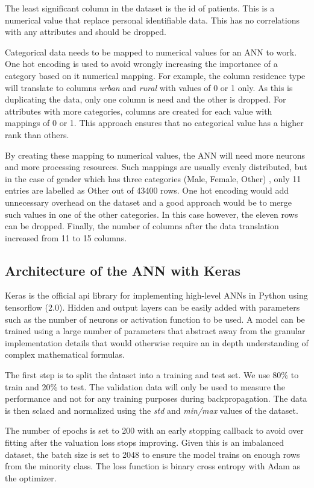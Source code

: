 \documentclass[proposal]{softeng}
\begin{document}
The least significant column in the dataset is the id of patients. This is a numerical value that replace personal identifiable data. This has no correlations with any attributes and should be dropped.

Categorical data needs to be mapped to numerical values for  an ANN to work. One hot encoding is used to avoid wrongly increasing the importance of a category based on it numerical mapping. For example, the column residence type will translate to columns \textit{urban} and \textit{rural} with values of 0 or 1 only. As this is duplicating the data, only one column is need and the other is dropped. For attributes with more categories, columns are created for each value  with mappings of 0 or 1. This approach ensures that no categorical value has a higher rank than others.

By creating these mapping to numerical values, the ANN will need more neurons and more processing resources. Such mappings are usually evenly distributed, but in the case of gender which has three categories (Male, Female, Other) , only 11 entries are labelled as Other out of 43400 rows. One hot encoding would add unnecessary overhead on the dataset and a good approach would be to merge such values in one of the other categories. In this case however, the eleven rows can be dropped. Finally, the number of columns after the data translation increased from 11 to 15 columns.

\subsection{Architecture of the ANN with Keras}

Keras\cite{keras} is the official api library for implementing high-level ANNs in Python using tensorflow (2.0). Hidden and output layers can be easily added with parameters such as the number of neurons or activation function to be used. A model can be trained using a large number of parameters that abstract away from the granular implementation details that would otherwise require an in depth understanding of complex mathematical formulas.

The first step is to split the dataset into a training and test set. We use 80\% to train and 20\% to test. The validation data will only be used to measure the performance and not for any training purposes during backpropagation. The data is then sclaed and normalized using the \textit{std} and \textit{min/max} values of the dataset.

The number of epochs is set to 200 with an early stopping callback to avoid over fitting after the valuation loss stops improving. Given this is an imbalanced dataset, the batch size is set to 2048 to ensure the model trains on enough rows from the minority class. The loss function is binary cross entropy with Adam as the optimizer.
\end{document}
